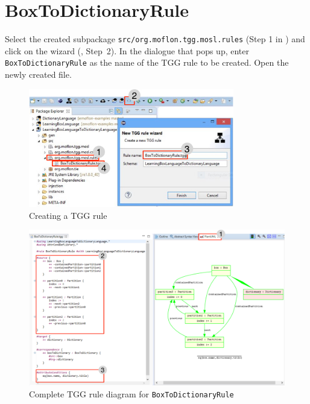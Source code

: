 \newpage
\hypertarget{rules vis}{}
\section{BoxToDictionaryRule}
\genHeader

\begin{stepbystep}

\item Select the created subpackage \texttt{src/org.moflon.tgg.mosl.rules} (Step 1 in ) and click on the wizard  (\eMoflonCreateTGGRuleIcon, Step~2).
In the dialogue that pops up, enter \texttt{BoxToDictionaryRule} as the name of the TGG rule to be created.
Open the newly created file.

\begin{figure}[htbp]
\begin{center}
  \includegraphics[width=0.8\textwidth]{../../org.moflon.doc.handbook.04_tripleGraphTransformations/4_rules/visRImages/ea_TGGNewRule.jpg}
  \caption{Creating a TGG rule}
  \label{ea:create_tgg_rule}
\end{center}
\end{figure}

\begin{figure}[htbp]
\begin{center}
  \includegraphics[angle=90,width=\textwidth]{../../org.moflon.doc.handbook.04_tripleGraphTransformations/4_rules/visRImages/ea_BoxToDictionaryRuleComplete.pdf}
  \caption{Complete TGG rule diagram for \texttt{BoxToDictionaryRule}}
  \label{ea:boxtodictionaryrule_complete}
  \end{center}
\end{figure}


\end{stepbystep}
